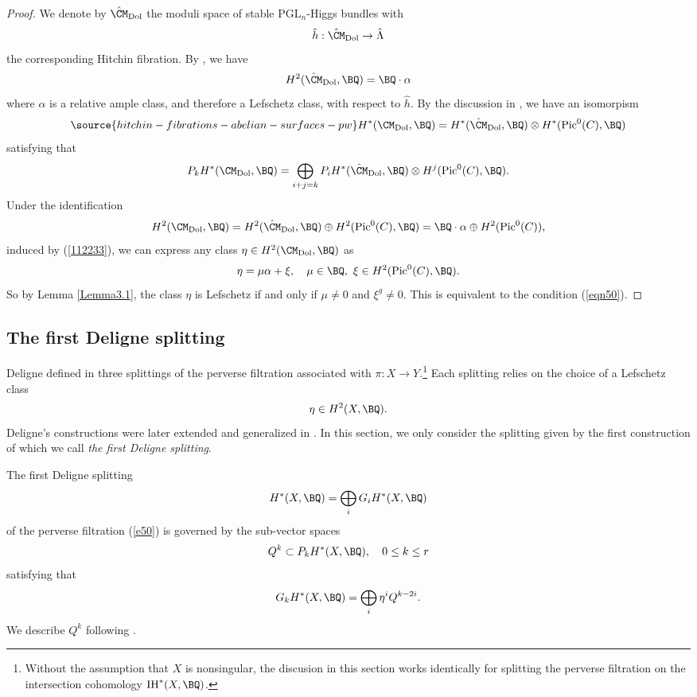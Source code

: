 \begin{proof}
We denote by $\hat{\CM}_{\mathrm{Dol}}$ the moduli space of stable $\mathrm{PGL}_n$-Higgs bundles with
\[
\hat{h}: \hat{\CM}_{\mathrm{Dol}} \to \hat{\Lambda}
\]
the corresponding Hitchin fibration. By \cite{HT1,Markman}, we have
\[
H^2( \hat{\CM}_{\mathrm{Dol}}, \BQ ) = \BQ \cdot \alpha
\]
where $\alpha$ is a relative ample class, and therefore a Lefschetz class, with respect to $\hat{h}$. By the discussion in \cite[Section 2.4]{dCHM1}, we have an isomorpism
\begin{equation}\label{112233}
\source{hitchin-fibrations-abelian-surfaces-pw}
H^*(\CM_{\mathrm{Dol}}, \BQ) = H^*( \hat{\CM}_{\mathrm{Dol}}, \BQ ) \otimes H^*(\mathrm{Pic}^0(C), \BQ)
\end{equation}
satisfying that
\[
P_k H^*(\CM_{\mathrm{Dol}}, \BQ) = \bigoplus_{i+j=k} P_iH^*( \hat{\CM}_{\mathrm{Dol}}, \BQ ) \otimes H^j(\mathrm{Pic}^0(C), \BQ).
\]
Under the identification
\[
H^2(\CM_{\mathrm{Dol}}, \BQ) = H^2( \hat{\CM}_{\mathrm{Dol}}, \BQ ) \oplus H^2(\mathrm{Pic}^0(C), \BQ) = \BQ \cdot \alpha  \oplus H^2(\mathrm{Pic}^0(C)),
\]
induced by (\ref{112233}), we can express any class $\eta \in H^2(\CM_{\mathrm{Dol}}, \BQ)$ as
\[
\eta = \mu \alpha + \xi, \quad \mu \in \BQ,~ \xi \in H^2(\mathrm{Pic}^0(C), \BQ).
\]
So by Lemma \ref{Lemma3.1}, the class $\eta$ is Lefschetz if and only if $\mu \neq 0$ and $\xi^g\neq 0$. This is equivalent to the condition (\ref{eqn50}).
\end{proof}

\subsection{The first Deligne splitting}
Deligne defined in \cite{D} three splittings of the perverse filtration associated with $\pi: X\to Y$.\footnote{Without the assumption that $X$ is nonsingular, the discusion in this section works identically for splitting the perverse filtration on the intersection cohomology $\mathrm{IH}^*(X, \BQ)$.} Each splitting relies on the choice of a Lefschetz class
\[
\eta \in H^2(X, \BQ).
\]
Deligne's constructions were later extended and generalized in \cite{dC,dCM4}. In this section, we only consider the splitting given by the first construction of \cite{D} which we call \emph{the first Deligne splitting}.


The first Deligne splitting
\[
H^*(X,\BQ) = \bigoplus_{i}G_iH^*(X, \BQ)
\]
of the perverse filtration (\ref{e50}) is governed by the sub-vector spaces
\[
Q^k \subset P_kH^*(X, \BQ),\quad  0\leq k\leq r
\]
satisfying that
\[
G_kH^*(X, \BQ) = \bigoplus_i \eta^i Q^{k-2i}.
\]
We describe $Q^k$ following \cite[Section 2.7]{dCM4}.

